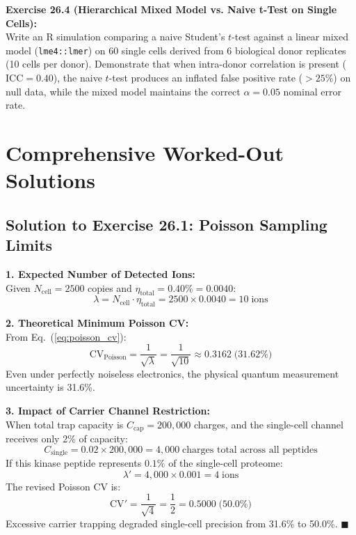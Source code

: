 \documentclass[11pt,twoside,openright]{book}
\begin{document}
\vspace{0.8em}
\noindent
\textbf{Exercise 26.4 (Hierarchical Mixed Model vs. Naive t-Test on Single Cells):}\\
Write an R simulation comparing a naive Student's $t$-test against a linear mixed model (\texttt{lme4::lmer}) on 60 single cells derived from 6 biological donor replicates (10 cells per donor). Demonstrate that when intra-donor correlation is present ($\text{ICC} = 0.40$), the naive $t$-test produces an inflated false positive rate ($>25\%$) on null data, while the mixed model maintains the correct $\alpha = 0.05$ nominal error rate.

\section{Comprehensive Worked-Out Solutions}

\subsection*{Solution to Exercise 26.1: Poisson Sampling Limits}

\textbf{1. Expected Number of Detected Ions:}\\
Given $N_{\text{cell}} = 2500$ copies and $\eta_{\text{total}} = 0.40\% = 0.0040$:
\begin{equation}
\lambda = N_{\text{cell}} \cdot \eta_{\text{total}} = 2500 \times 0.0040 = 10 \;\text{ions}
\end{equation}

\textbf{2. Theoretical Minimum Poisson CV:}\\
From Eq.~(\ref{eq:poisson_cv}):
\begin{equation}
\text{CV}_{\text{Poisson}} = \frac{1}{\sqrt{\lambda}} = \frac{1}{\sqrt{10}} \approx 0.3162 \;\text{(31.62\%)}
\end{equation}
Even under perfectly noiseless electronics, the physical quantum measurement uncertainty is 31.6\%.

\textbf{3. Impact of Carrier Channel Restriction:}\\
When total trap capacity is $C_{\text{cap}} = 200{,}000$ charges, and the single-cell channel receives only 2\% of capacity:
\begin{equation}
C_{\text{single}} = 0.02 \times 200{,}000 = 4{,}000 \;\text{charges total across all peptides}
\end{equation}
If this kinase peptide represents $0.1\%$ of the single-cell proteome:
\begin{equation}
\lambda' = 4{,}000 \times 0.001 = 4 \;\text{ions}
\end{equation}
The revised Poisson CV is:
\begin{equation}
\text{CV}' = \frac{1}{\sqrt{4}} = \frac{1}{2} = 0.5000 \;\text{(50.0\%)}
\end{equation}
Excessive carrier trapping degraded single-cell precision from 31.6\% to 50.0\%. \hfill $\blacksquare$
\end{document}

